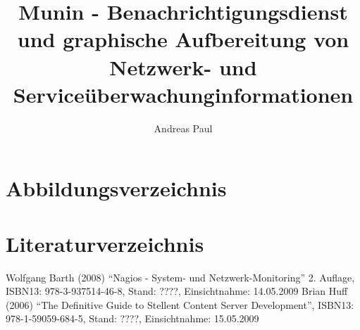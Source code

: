 \documentclass[12pt, a4paper, headsepline]{article}
\author{Andreas Paul}
\title{Munin - Benachrichtigungsdienst und graphische Aufbereitung von Netzwerk- und Serviceüberwachunginformationen}
\renewcommand{\refname}{Quellenverzeichnis}
\begin{document}
\setlength{\parindent}{0mm}

\thispagestyle{empty}
\newpage 
\renewcommand{\contentsname}{Inhalt}
\tableofcontents
\newpage

\newpage
 
\newpage

\newpage
 \newpage
 \newpage
 \newpage
% 


\section{Abbildungsverzeichnis}
\listoffigures

\newpage
\renewcommand{\refname}{} 
\section{Literaturverzeichnis}
\begin{thebibliography}{xxxxxx}
	 Wolfgang Barth (2008) "`Nagios - System- und Netzwerk-Monitoring"' 2. Auflage, \newline ISBN13: 978-3-937514-46-8, \newline Stand: ????, Einsichtnahme: 14.05.2009
	  Brian Huff (2006) "`The Definitive Guide to Stellent Content Server Development"', \newline ISBN13: 978-1-59059-684-5, \newline Stand: ????, Einsichtnahme: 15.05.2009
\end{thebibliography}\newpage
\end{document}
